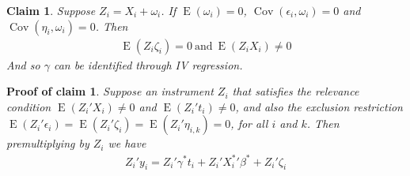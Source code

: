 \documentclass[10pt]{article}
\newtheorem{claim}{Claim}
\newtheorem{claimproof}{Proof of claim}[claim]
\begin{document}
        \begin{claim}
        Suppose $ Z_i=X_i+\omega_i$. If $\operatorname{E}(\omega_i)=0$, $\operatorname{Cov}(\epsilon_i,\omega_i)=0$ and $\operatorname{Cov}(\eta_i,\omega_i)=0$. Then
        \begin{align}
        \operatorname{E}(Z_i\zeta_i)=0 \ \text{and} \  \operatorname{E}(Z_iX_i)\neq0
        \end{align}
        And so $\gamma$ can be identified through IV regression.
        \end{claim}
        \begin{claimproof}

        Suppose an instrument $Z_i$ that satisfies the relevance condition $\operatorname{E}(Z_i'X_i)\neq 0$ and $\operatorname{E}(Z_i't_i)\neq 0$, and also the exclusion restriction $\operatorname{E}(Z_i'\epsilon_i)=\operatorname{E}(Z_i'\zeta_i)=\operatorname{E}(Z_i'\eta_{i,k})=0$, for all $i$ and $k$. Then premultiplying by $Z_i$ we have
                \begin{align}
                    Z_i'y_i =  Z_i'\gamma^* t_i +  Z_i'{X^{*}_i}' \beta^* +  Z_i'\zeta_i
                \end{align}
                

\end{claimproof}
\end{document}
